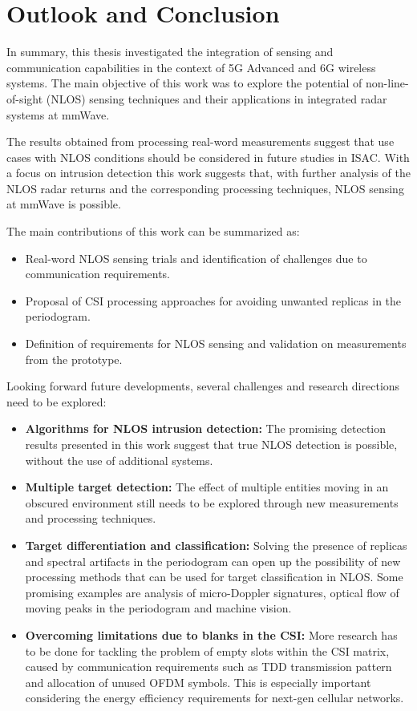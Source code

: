 \chapter{Outlook and Conclusion}

In summary, this thesis investigated the integration of sensing and communication capabilities in the context of 5G Advanced and 6G wireless systems. 
The main objective of this work was to explore the potential of non-line-of-sight (NLOS) sensing techniques and their applications in integrated radar systems at mmWave. 

The results obtained from processing real-word measurements suggest that use cases with NLOS conditions should be considered in future studies in ISAC.
With a focus on intrusion detection this work suggests that, with further analysis of the NLOS radar returns and the corresponding processing techniques, NLOS sensing at mmWave is possible.

The main contributions of this work can be summarized as:

\begin{itemize}
	\item Real-word NLOS sensing trials and identification of challenges due to communication requirements.
	\item Proposal of CSI processing approaches for avoiding unwanted replicas in the periodogram.
	\item Definition of requirements for NLOS sensing and validation on measurements from the prototype.
\end{itemize}

Looking forward future developments, several challenges and research directions need to be explored:

\begin{itemize}
	\item \textbf{Algorithms for NLOS intrusion detection:} The promising detection results presented in this work suggest that true NLOS detection is possible, without the use of additional systems.
	\item \textbf{Multiple target detection:} The effect of multiple entities moving in an obscured environment still needs to be explored through new measurements and processing techniques.
	\item \textbf{Target differentiation and classification:} Solving the presence of replicas and spectral artifacts in the periodogram can open up the possibility of new processing methods that can be used for target classification in NLOS. Some promising examples are analysis of micro-Doppler signatures, optical flow of moving peaks in the periodogram and machine vision.
	\item \textbf{Overcoming limitations due to blanks in the CSI:} More research has to be done for tackling the problem of empty slots within the CSI matrix, caused by communication requirements such as TDD transmission pattern and allocation of unused OFDM symbols. This is especially important considering the energy efficiency requirements for next-gen cellular networks.
\end{itemize}
